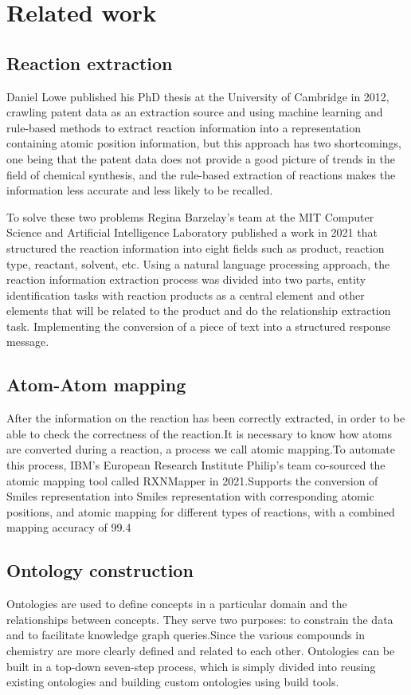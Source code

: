 \documentclass[%
 aip,
 jmp,%
 amsmath,amssymb,
 reprint,%
]{revtex4-2}
\begin{document}
\section{Related work}



\subsection{Reaction extraction}
Daniel Lowe published his PhD thesis at the University of Cambridge in 2012, crawling patent data as an extraction source and using 
machine learning and rule-based methods to extract reaction information into a representation containing atomic position information, 
but this approach has two shortcomings, one being that the patent data does not provide a good picture of trends in the field of chemical 
synthesis, and the rule-based extraction of reactions makes the information less accurate and less likely to be recalled.

To solve these two problems Regina Barzelay's team at the MIT Computer Science and Artificial Intelligence Laboratory published a work 
in 2021 that structured the reaction information into eight fields such as product, reaction type, reactant, solvent, etc. Using a 
natural language processing approach, the reaction information extraction process was divided into two parts, entity identification tasks
with reaction products as a central element and other elements that will be related to the product and do the relationship extraction task.
Implementing the conversion of a piece of text into a structured response message.


\subsection{Atom-Atom mapping}
After the information on the reaction has been correctly extracted, in order to be able to check the correctness of the reaction.It is necessary
to know how atoms are converted during a reaction, a process we call atomic mapping.To automate this process, IBM's European Research Institute 
Philip's team co-sourced the atomic mapping tool called RXNMapper in 2021.Supports the conversion of Smiles representation into Smiles 
representation with corresponding atomic positions, and atomic mapping for different types of reactions, with a combined mapping accuracy 
of 99.4%

\subsection{Ontology construction}
Ontologies are used to define concepts in a particular domain and the relationships between concepts. They serve two purposes: to constrain 
the data and to facilitate knowledge graph queries.Since the various compounds in chemistry are more clearly defined and related to each other.
Ontologies can be built in a top-down seven-step process, which is simply divided into reusing existing ontologies and building custom 
ontologies using build tools.
\end{document}
